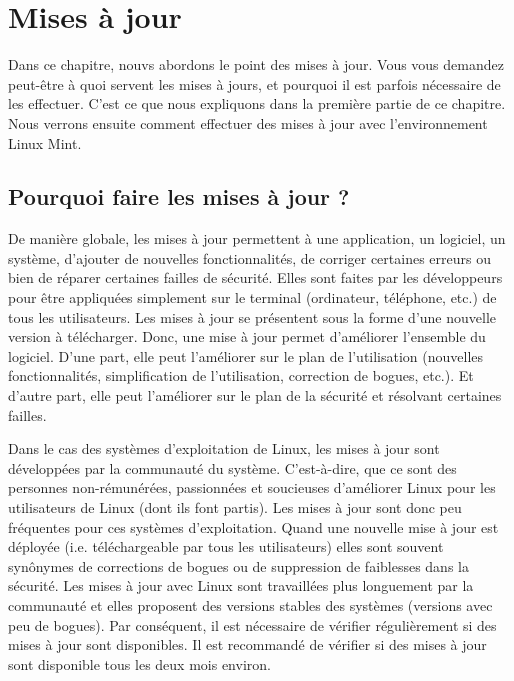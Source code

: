 \documentclass[12pt]{book}
\begin{document}
\chapter{Mises à jour}\label{sec:maj}
	Dans ce chapitre, nouvs abordons le point des mises à jour.
	Vous vous demandez peut-être à quoi servent les mises à jours, et pourquoi il est parfois nécessaire de les effectuer. 
	C'est ce que nous expliquons dans la première partie de ce chapitre.
	Nous verrons ensuite comment effectuer des mises à jour avec l'environnement Linux Mint.
	\section{Pourquoi faire les mises à jour ?}\label{sec:maj_pourquoi}
		De manière globale, les mises à jour permettent à une application, un logiciel, un système, d'ajouter de nouvelles fonctionnalités, de corriger certaines erreurs ou bien de réparer certaines failles de sécurité.
		Elles sont faites par les développeurs pour être appliquées simplement sur le terminal (ordinateur, téléphone, etc.) de tous les utilisateurs.
		Les mises à jour se présentent sous la forme d'une nouvelle version à télécharger.
		Donc, une mise à jour permet d'améliorer l'ensemble du logiciel.
		D'une part, elle peut l'améliorer sur le plan de l'utilisation (nouvelles fonctionnalités, simplification de l'utilisation, correction de bogues, etc.).
		Et d'autre part, elle peut l'améliorer sur le plan de la sécurité et résolvant certaines failles.\par
		Dans le cas des systèmes d'exploitation de Linux, les mises à jour sont développées par la communauté du système.
		C'est-à-dire, que ce sont des personnes non-rémunérées, passionnées et soucieuses d'améliorer Linux pour les utilisateurs de Linux (dont ils font partis).
		Les mises à jour sont donc peu fréquentes pour ces systèmes d'exploitation.
		Quand une nouvelle mise à jour est déployée (i.e. téléchargeable par tous les utilisateurs) elles sont souvent synônymes de corrections de bogues ou de suppression de faiblesses dans la sécurité.
		Les mises à jour avec Linux sont travaillées plus longuement par la communauté et elles proposent des versions stables des systèmes (versions avec peu de bogues).
		Par conséquent, il est nécessaire de vérifier régulièrement si des mises à jour sont disponibles.
		Il est recommandé de vérifier si des mises à jour sont disponible tous les deux mois environ.
\end{document}
